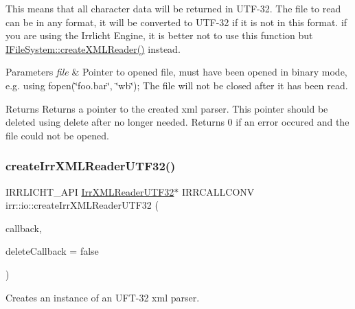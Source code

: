 This means that all character data will be returned in U\+T\+F-\/32. The file to read can be in any format, it will be converted to U\+T\+F-\/32 if it is not in this format. if you are using the Irrlicht Engine, it is better not to use this function but \hyperlink{classirr_1_1io_1_1IFileSystem_a167c9fa159d16ee5c56c074636b0865e}{I\+File\+System\+::create\+X\+M\+L\+Reader()} instead. 
\begin{DoxyParams}{Parameters}
{\em file} & Pointer to opened file, must have been opened in binary mode, e.\+g. using fopen(\char`\"{}foo.\+bar\char`\"{}, \char`\"{}wb\char`\"{}); The file will not be closed after it has been read. \\
\hline
\end{DoxyParams}
\begin{DoxyReturn}{Returns}
Returns a pointer to the created xml parser. This pointer should be deleted using \textquotesingle{}delete\textquotesingle{} after no longer needed. Returns 0 if an error occured and the file could not be opened. 
\end{DoxyReturn}
\mbox{\label{namespaceirr_1_1io_a0f6ab4835641471a523c485c8d229eb2}} 
\subsubsection{\texorpdfstring{create\+Irr\+X\+M\+L\+Reader\+U\+T\+F32()}{createIrrXMLReaderUTF32()}\hspace{0.1cm}{\footnotesize\ttfamily [3/3]}}
{\footnotesize\ttfamily I\+R\+R\+L\+I\+C\+H\+T\+\_\+\+A\+PI \hyperlink{namespaceirr_1_1io_a70f411ff403636fb5c4e9becb090d5ec}{Irr\+X\+M\+L\+Reader\+U\+T\+F32}$\ast$ I\+R\+R\+C\+A\+L\+L\+C\+O\+NV irr\+::io\+::create\+Irr\+X\+M\+L\+Reader\+U\+T\+F32 (\begin{DoxyParamCaption}\item[{\hyperlink{classirr_1_1io_1_1IFileReadCallBack}{I\+File\+Read\+Call\+Back} $\ast$}]{callback,  }\item[{bool}]{delete\+Callback = {\ttfamily false} }\end{DoxyParamCaption})}



Creates an instance of an U\+F\+T-\/32 xml parser. 


